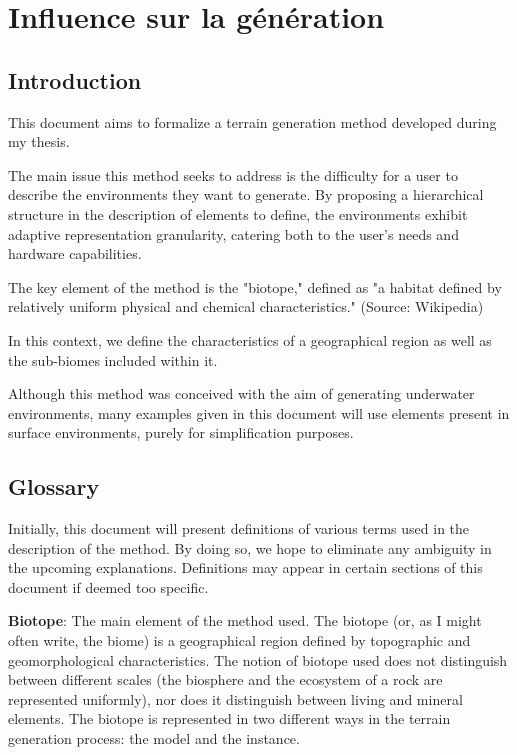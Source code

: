 \chapter{Influence sur la génération}
\label{chap:influence-on-env-objects}
\minitoc


\section{Introduction}
\label{sec:influence-on-env-objects_introduction}
This document aims to formalize a terrain generation method developed during my thesis.

The main issue this method seeks to address is the difficulty for a user to describe the environments they want to generate. By proposing a hierarchical structure in the description of elements to define, the environments exhibit adaptive representation granularity, catering both to the user's needs and hardware capabilities.

The key element of the method is the "biotope," defined as "a habitat defined by relatively uniform physical and chemical characteristics." (Source: Wikipedia)

In this context, we define the characteristics of a geographical region as well as the sub-biomes included within it.

Although this method was conceived with the aim of generating underwater environments, many examples given in this document will use elements present in surface environments, purely for simplification purposes.

\section{Glossary}
\label{sec:influence-on-env-objects_glossary}
Initially, this document will present definitions of various terms used in the description of the method. By doing so, we hope to eliminate any ambiguity in the upcoming explanations. Definitions may appear in certain sections of this document if deemed too specific.

\textbf{Biotope}: The main element of the method used. The biotope (or, as I might often write, the biome) is a geographical region defined by topographic and geomorphological characteristics. The notion of biotope used does not distinguish between different scales (the biosphere and the ecosystem of a rock are represented uniformly), nor does it distinguish between living and mineral elements. The biotope is represented in two different ways in the terrain generation process: the model and the instance.

